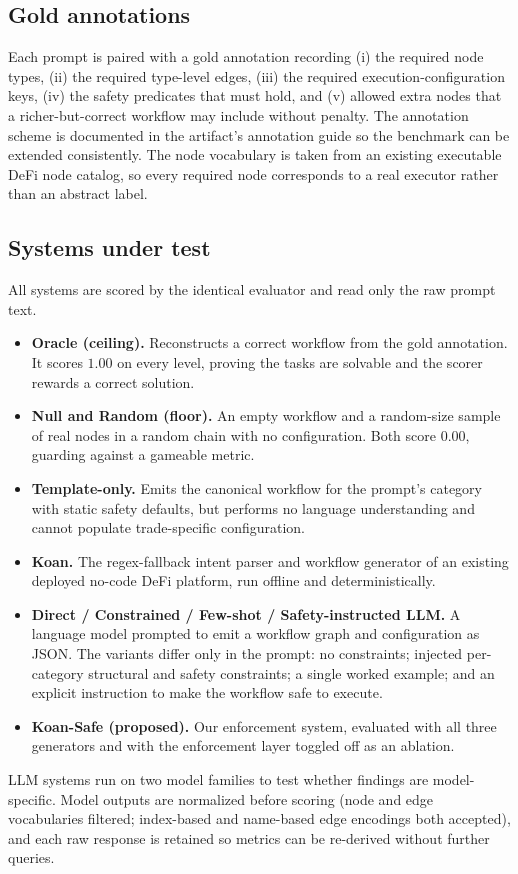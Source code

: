 \subsection{Gold annotations}

Each prompt is paired with a gold annotation recording (i) the required
node types, (ii) the required type-level edges, (iii) the required
execution-configuration keys, (iv) the safety predicates that must hold,
and (v) allowed extra nodes that a richer-but-correct workflow may include
without penalty. The annotation scheme is documented in the artifact's
annotation guide so the benchmark can be extended consistently. The node
vocabulary is taken from an existing executable DeFi node catalog, so
every required node corresponds to a real executor rather than an
abstract label.

\subsection{Systems under test}

All systems are scored by the identical evaluator and read only the raw
prompt text.

\begin{itemize}
  \item \textbf{Oracle (ceiling).} Reconstructs a correct workflow from
        the gold annotation. It scores $1.00$ on every level, proving the
        tasks are solvable and the scorer rewards a correct solution.
  \item \textbf{Null and Random (floor).} An empty workflow and a
        random-size sample of real nodes in a random chain with no
        configuration. Both score $0.00$, guarding against a gameable
        metric.
  \item \textbf{Template-only.} Emits the canonical workflow for the
        prompt's category with static safety defaults, but performs no
        language understanding and cannot populate trade-specific
        configuration.
  \item \textbf{Koan.} The regex-fallback intent parser and workflow
        generator of an existing deployed no-code DeFi platform, run
        offline and deterministically.
  \item \textbf{Direct / Constrained / Few-shot / Safety-instructed
        LLM.} A language model prompted to emit a workflow graph and
        configuration as JSON. The variants differ only in the prompt:
        no constraints; injected per-category structural and safety
        constraints; a single worked example; and an explicit instruction
        to make the workflow safe to execute.
  \item \textbf{Koan-Safe (proposed).} Our enforcement system, evaluated
        with all three generators and with the enforcement layer toggled
        off as an ablation.
\end{itemize}

LLM systems run on two model families to test whether findings are
model-specific. Model outputs are normalized before scoring (node and
edge vocabularies filtered; index-based and name-based edge encodings
both accepted), and each raw response is retained so metrics can be
re-derived without further queries.
